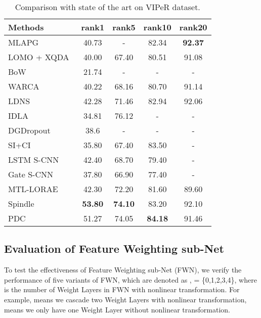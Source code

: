 \documentclass[10pt,twocolumn,letterpaper]{article}
\begin{document}
\begin{table}
\caption{Comparison with state of the art on VIPeR dataset.}
\vspace{-2mm}
\footnotesize
\begin{center}
\begin{tabular}{|l|cccc|}
\hline
 Methods            &rank1    &rank5    &rank10   &rank20 \\
\hline
MLAPG~\cite{liao2015efficient}       &40.73     &-    &82.34    &{\bf 92.37}    \\
LOMO + XQDA~\cite{liao2015person}            &40.00   &67.40    &80.51    &91.08\\
BoW~\cite{zheng2015scalable}       &21.74    &-    &-    &-  \\
WARCA~\cite{jose2016scalable}        &40.22    &68.16    &80.70    &91.14\\
LDNS~\cite{zhang2016learning}    &42.28 &71.46   &82.94&92.06\\
\hline
IDLA~\cite{ahmed5improved}  &34.81    &76.12    &-    &-\\
DGDropout~\cite{xiao2016learning}   & 38.6 & -& - & -\\
SI+CI~\cite{wangjoint}  &35.80   &67.40    &83.50    &-\\
LSTM S-CNN~\cite{varior2016siamese}  &42.40 &68.70 &79.40&-\\
Gate S-CNN~\cite{varior2016gated} &37.80    &66.90    &77.40    &-\\
MTL-LORAE~\cite{su2017multi}&42.30&72.20&81.60&89.60\\
\hline
Spindle~\cite{zhao2017spindle}   &{\bf 53.80}  &{\bf 74.10}   &83.20 &92.10\\
\hline
PDC     &51.27&74.05&{\bf 84.18}&91.46\\
\hline
\end{tabular}
\end{center}
\vspace{-5mm}
\label{table:viper}
\end{table}


\subsection{Evaluation of Feature Weighting sub-Net}
\label{sec:weight}
To test the effectiveness of Feature Weighting sub-Net (FWN), we verify the performance of five variants of FWN, which are denoted as ,  = \{0,1,2,3,4\}, where  is the number of Weight Layers in FWN with nonlinear transformation. For example,  means we cascade two Weight Layers with nonlinear transformation,  means we only have one Weight Layer without nonlinear transformation.
\end{document}

